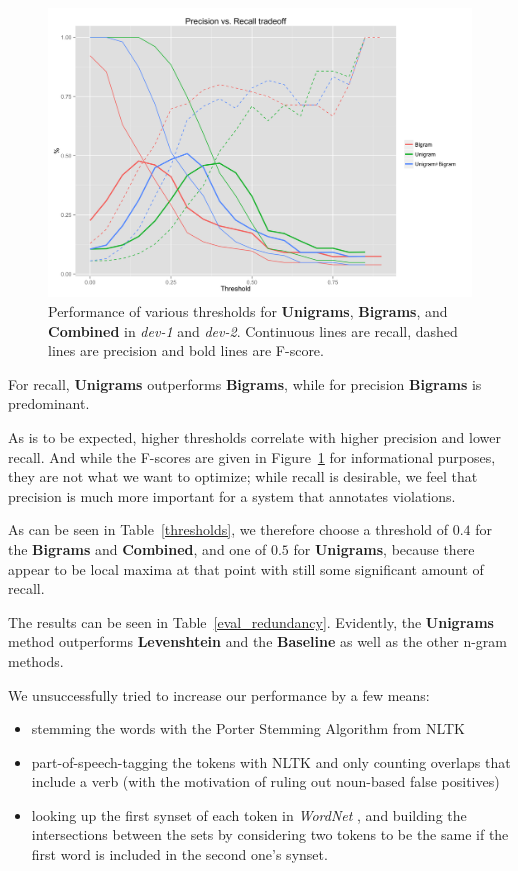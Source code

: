 \documentclass[a4paper,10pt]{scrartcl}
\theoremstyle{style}
\begin{document}
\begin{figure}
\begin{center}
\includegraphics[scale=0.15]{a.png}
\end{center}
\caption{Performance of various thresholds for \textbf{Unigrams}, \textbf{Bigrams}, and \textbf{Combined} in \textit{dev-1} and \textit{dev-2}. Continuous lines are recall, dashed lines are precision and bold lines are F-score.}
\label{redundancy_graph}
\end{figure}

For recall, \textbf{Unigrams} outperforms \textbf{Bigrams}, while for precision \textbf{Bigrams} is predominant.

As is to be expected, higher thresholds correlate with higher precision and lower recall. And while the F-scores are given in Figure~\ref{redundancy_graph} for informational purposes, they are not what we want to optimize; while recall is desirable, we feel that precision is much more important for a system that annotates violations.

As can be seen in Table~\ref{thresholds}, we therefore choose a threshold of $0.4$ for the \textbf{Bigrams} and \textbf{Combined}, and one of $0.5$ for \textbf{Unigrams}, because there appear to be local maxima at that point with still some significant amount of recall.

The results can be seen in Table~\ref{eval_redundancy}. Evidently, the \textbf{Unigrams} method outperforms \textbf{Levenshtein} and the \textbf{Baseline} as well as the other n-gram methods.

We unsuccessfully tried to increase our performance by a few means:

\begin{itemize}
\item stemming the words with the Porter Stemming Algorithm \citep{porter1980algorithm} from NLTK \citep{bird2009natural}
\item part-of-speech-tagging the tokens with NLTK and only counting overlaps that include a verb (with the motivation of ruling out noun-based false positives)
\item looking up the first synset of each token in \textit{WordNet} \citep{fellbaum2005wordnet}, and building the intersections between the sets by considering two tokens to be the same if the first word is included in the second one's synset.
\end{itemize}
\end{document}
